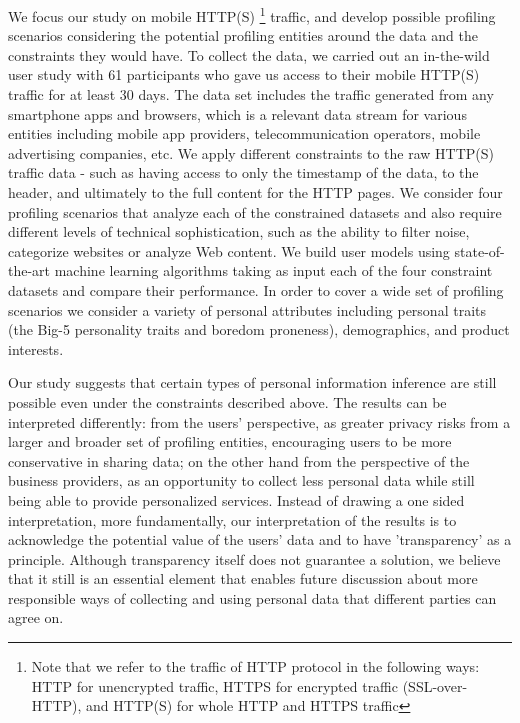 We focus our study on mobile HTTP(S) 
\footnote{Note that we refer to the traffic of HTTP protocol in the following ways: HTTP for unencrypted traffic, HTTPS for encrypted traffic (SSL-over-HTTP), and HTTP(S) for whole HTTP and HTTPS traffic} traffic, and develop possible profiling scenarios considering the potential profiling entities around the data and the constraints they would have. To collect the data, we carried out an in-the-wild user study with 61 participants who gave us access to their mobile HTTP(S) traffic for at least 30 days. The data set includes the traffic generated from any smartphone apps and browsers, which is a relevant data stream for various entities including mobile app providers, telecommunication operators, mobile advertising companies, etc. We apply different constraints to the raw HTTP(S) traffic data - such as having access to only the timestamp of the data, to the header, and ultimately to the full content for the HTTP pages. We consider four profiling scenarios that analyze each of the constrained datasets and also require different levels of technical sophistication, such as the ability to filter noise, categorize websites or analyze Web content. We build user models using state-of-the-art machine learning algorithms taking as input each of the four constraint datasets and compare their performance. In order to cover a wide set of profiling scenarios we consider a variety of personal attributes including personal traits (the Big-5 personality traits and boredom proneness), demographics, and product interests. 

Our study suggests that certain types of personal information inference are still possible even under the constraints described above. The results can be interpreted differently: from the users' perspective, as greater privacy risks from a larger and broader set of profiling entities, encouraging users to be more conservative in sharing data; on the other hand from the perspective of the business providers, as an opportunity to collect less personal data while still being able to provide personalized services. Instead of drawing a one sided interpretation, more fundamentally, our interpretation of the results is to acknowledge the potential value of the users' data and to have 'transparency' as a principle. Although transparency itself does not guarantee a solution\cite{nissenbaum2011contextual, acquisti2005privacy}, we believe that it still is an essential element that enables future discussion about more responsible ways of collecting and using personal data that different parties can agree on.

